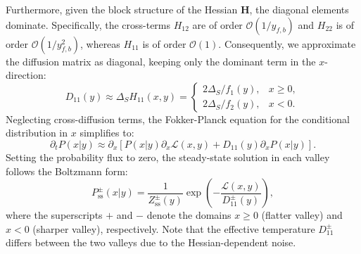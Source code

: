 \documentclass[aps,prx,reprint,superscriptaddress,longbibliography,nofootinbib,floatfix]{revtex4-2}
\begin{document}
Furthermore, given the block structure of the Hessian $\mathbf{H}$, the diagonal elements dominate. Specifically, the cross-terms $H_{12}$ are of order $\mathcal{O}(1/y_{f,b})$ and $H_{22}$ is of order $\mathcal{O}(1/y_{f,b}^2)$, whereas $H_{11}$ is of order $\mathcal{O}(1)$. Consequently, we approximate the diffusion matrix as diagonal, keeping only the dominant term in the $x$-direction:
\begin{equation}
    D_{11}(y) \approx \Delta_S H_{11}(x,y) = 
    \begin{cases}
        {2\Delta_S}/{f_1(y)}, & x \geq 0, \\
        {2\Delta_S}/{f_2(y)}, & x < 0.
    \end{cases}
\end{equation}
Neglecting cross-diffusion terms, the Fokker-Planck equation for the conditional distribution in $x$ simplifies to:
\begin{equation}
    \partial_t P(x|y) \approx \partial_x \left[ P(x|y) \partial_x \mathcal{L}(x,y) + D_{11}(y) \partial_x P(x|y) \right].
\end{equation}
Setting the probability flux to zero, the steady-state solution in each valley follows the Boltzmann form:
\begin{equation}
    P_{\mathrm{ss}}^{\pm}(x|y) = \frac{1}{Z_{\mathrm{ss}}^{\pm}(y)} \exp\left( -\frac{\mathcal{L}(x,y)}{D_{11}^{\pm}(y)} \right),
\end{equation}
where the superscripts $+$ and $-$ denote the domains $x \ge 0$ (flatter valley) and $x < 0$ (sharper valley), respectively. Note that the effective temperature $D_{11}^{\pm}$ differs between the two valleys due to the Hessian-dependent noise.
\end{document}
